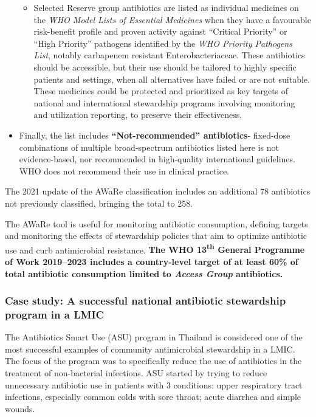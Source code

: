 \documentclass[
  11pt,
  paper=a4,
  ,captions=tableheading
]{scrartcl}
\providecommand{\tightlist}{%
  \setlength{\itemsep}{0pt}\setlength{\parskip}{0pt}}
\begin{document}
\begin{itemize}
  \begin{itemize}
  \tightlist
  \item
    Selected Reserve group antibiotics are listed as individual
    medicines on the \emph{WHO Model Lists of Essential Medicines} when
    they have a favourable risk-benefit profile and proven activity
    against ``Critical Priority'' or ``High Priority'' pathogens
    identified by the \emph{WHO Priority Pathogens List}, notably
    carbapenem resistant Enterobacteriaceae. These antibiotics should be
    accessible, but their use should be tailored to highly specific
    patients and settings, when all alternatives have failed or are not
    suitable. These medicines could be protected and prioritized as key
    targets of national and international stewardship programs involving
    monitoring and utilization reporting, to preserve their
    effectiveness.
  \end{itemize}
\item
  Finally, the list includes \textbf{``Not-recommended'' antibiotics}-
  fixed-dose combinations of multiple broad-spectrum antibiotics listed
  here is not evidence-based, nor recommended in high-quality
  international guidelines. WHO does not recommend their use in clinical
  practice.
\end{itemize}

The 2021 update of the AWaRe classification includes an additional 78
antibiotics not previously classified, bringing the total to 258.

The AWaRe tool is useful for monitoring antibiotic consumption, defining
targets and monitoring the effects of stewardship policies that aim to
optimize antibiotic use and curb antimicrobial resistance. \textbf{The
WHO 13\textsuperscript{th} General Programme of Work 2019--2023 includes
a country-level target of at least 60\% of total antibiotic consumption
limited to \emph{Access Group} antibiotics.}

\hypertarget{case-study-a-successful-national-antibiotic-stewardship-program-in-a-lmic}{%
\subsubsection*{Case study: A successful national antibiotic stewardship
program in a
LMIC}\label{case-study-a-successful-national-antibiotic-stewardship-program-in-a-lmic}}

The Antibiotics Smart Use (ASU) program in Thailand is considered one of
the most successful examples of community antimicrobial stewardship in a
LMIC. The focus of the program was to specifically reduce the use of
antibiotics in the treatment of non-bacterial infections. ASU started by
trying to reduce unnecessary antibiotic use in patients with 3
conditions: upper respiratory tract infections, especially common colds
with sore throat; acute diarrhea and simple wounds.
\end{document}
